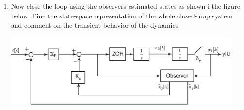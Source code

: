 \documentclass[twoside]{article}
\begin{document}
\begin{enumerate}
\item Now close the loop using the observers estimated states as shown i the figure below. Fine the state-space representation of the whole closed-loop system 
and comment on the transient behavior of the dynamics

\begin{center}
  \begin{minipage}[h]{0.9\linewidth}
    \begin{center}
      \includegraphics[width=0.95\textwidth]{block_PD_obs}
    \end{center}
  \end{minipage}
    \end{center}


\end{enumerate}
\end{document}
